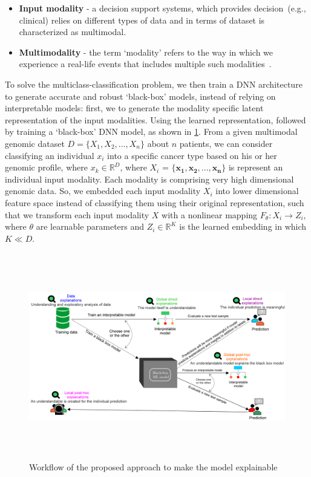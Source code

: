 \begin{itemize}[noitemsep]
    \item \textbf{Input modality} - a decision support systems, which provides decision~(e.g., clinical) relies on different types of data and in terms of dataset is characterized as multimodal. 
    \item \textbf{Multimodality} - the term `modality' refers to the way in which we experience a real-life events that includes multiple such modalities~\cite{mmsurvey}.
\end{itemize}  
        
\hspace*{3.5mm} To solve the multiclass-classification problem, we then train a DNN architecture to generate accurate and robust `black-box' models, instead of relying on interpretable models: first, we to generate the modality specific latent representation of the input modalities. Using the learned representation, followed by training a `black-box' DNN model, as shown in \cref{fig:chapter_2_wf}. From a given multimodal genomic dataset $D=\{X_1, X_2,..., X_n\}$ about $n$ patients, we can consider classifying an individual $x_i$ into a specific cancer type based on his or her genomic profile, where $x_k \in \mathbb{R}^{D}$, where $X_i$ = ${\mathbf{\{x_1,x_2,..., x_n}}\}$ is represent an individual input modality. Each modality is comprising very high dimensional genomic data. So, we embedded each input modality $X_i$ into lower dimensional feature space instead of classifying them using their original representation, such that we transform each input modality $X$ with a nonlinear mapping $F_{\theta}: X_i \rightarrow Z_i$, where $\theta$ are learnable parameters and $Z_i \in \mathbb{R}^{K}$ is the learned embedding in which $K \ll D$. 

\begin{figure}[h]
	\centering
		\includegraphics[width=\linewidth,height=90mm]{images/g_t_l_xai.png}
		\caption{Workflow of the proposed approach to make the model explainable}
        \label{fig:chapter_2_wf}
\end{figure}

